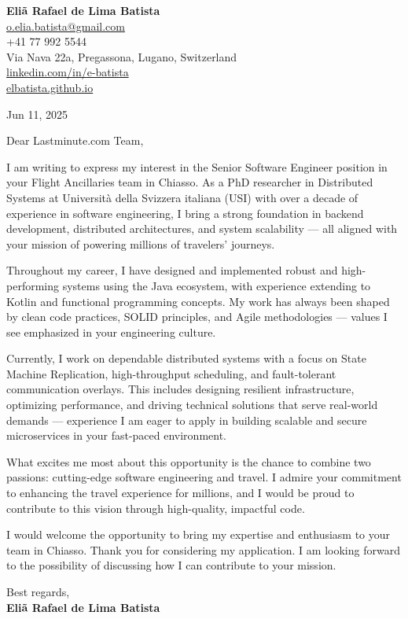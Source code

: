 \documentclass[11pt]{article}
\begin{document}
\noindent
\textbf{Eliã Rafael de Lima Batista} \\
\href{mailto:o.elia.batista@gmail.com}{o.elia.batista@gmail.com} \\
+41 77 992 5544 \\
Via Nava 22a, Pregassona, Lugano, Switzerland \\
\href{https://linkedin.com/in/e-batista}{linkedin.com/in/e-batista} \\
\href{https://elbatista.github.io}{elbatista.github.io}

\vspace{1em}

Jun 11, 2025 \\
\vspace{1em}

Dear Lastminute.com Team,

\vspace{1em}


I am writing to express my interest in the Senior Software Engineer position in your Flight Ancillaries team in Chiasso. As a PhD researcher in Distributed Systems at Università della Svizzera italiana (USI) with over a decade of experience in software engineering, I bring a strong foundation in backend development, distributed architectures, and system scalability — all aligned with your mission of powering millions of travelers' journeys.

Throughout my career, I have designed and implemented robust and high-performing systems using the Java ecosystem, with experience extending to Kotlin and functional programming concepts. My work has always been shaped by clean code practices, SOLID principles, and Agile methodologies — values I see emphasized in your engineering culture.

Currently, I work on dependable distributed systems with a focus on State Machine Replication, high-throughput scheduling, and fault-tolerant communication overlays. This includes designing resilient infrastructure, optimizing performance, and driving technical solutions that serve real-world demands — experience I am eager to apply in building scalable and secure microservices in your fast-paced environment.

What excites me most about this opportunity is the chance to combine two passions: cutting-edge software engineering and travel. I admire your commitment to enhancing the travel experience for millions, and I would be proud to contribute to this vision through high-quality, impactful code.

I would welcome the opportunity to bring my expertise and enthusiasm to your team in Chiasso. Thank you for considering my application. I am looking forward to the possibility of discussing how I can contribute to your mission.


\vspace{1em}

Best regards, \\
\textbf{Eliã Rafael de Lima Batista}
\end{document}
